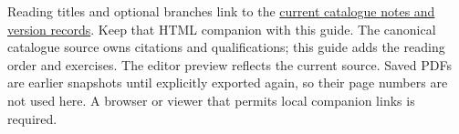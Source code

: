 Reading titles and optional branches link to the \href{catalogue_extended_notes.html}{current catalogue notes and version records}. Keep that HTML companion with this guide. The canonical catalogue source owns citations and qualifications; this guide adds the reading order and exercises. The editor preview reflects the current source. Saved PDFs are earlier snapshots until explicitly exported again, so their page numbers are not used here. A browser or viewer that permits local companion links is required.
